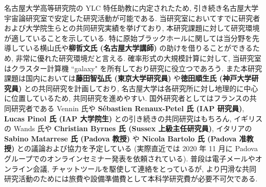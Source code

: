 \documentclass[11pt,a4paper,uplatex,dvipdfmx]{ujarticle} 		%
\newcommand{\研究課題名}{曲率ゆらぎの統計と原始ブラックホール量の精密対応}
\newcommand{\研究機関名}{名古屋大学}
\newcommand{\研究代表者氏名}{多田祐一郎}
\newcommand{\研究期間の最終元号年度}{4}  %
\renewcommand{\emph}[1]{{\sffamily\gtfamily\bfseries #1}}
\begin{document}
\noindent
名古屋大学高等研究院の YLC 特任助教に内定されたため, 引き続き名古屋大学宇宙論研究室で安定した研究活動が可能である.
当研究室においてすでに研究者および大学院生らとの共同研究実績を挙げており, 本研究課題に対して研究環境が適していることを示している.
特に原始ブラックホールに関しては当分野を先導している横山氏や\emph{柳哲文氏 (名古屋大学講師)} の助けを借りることができるため, 非常に優れた研究環境だと言える.
確率形式の大規模計算に対して, 当研究室はクラスター計算機 ``galaxy" を所有しており研究に役立つであろう.
また本研究課題は国内においては\emph{藤田智弘氏 (東京大学研究員)} や\emph{徳田順生氏 (神戸大学研究員)} との共同研究を計画しており,
名古屋大学は各研究所に対し地理的に中心に位置しているため, 共同研究を進めやすい.
国外研究者としてはフランスの共同研究者である Vennin 氏や \emph{S\'ebastien Renaux-Petel 氏 (IAP 研究員)}, \emph{Lucas Pinol 氏 (IAP 大学院生)} との引き続きの共同研究はもちろん,
イギリスの Wands 氏や \emph{Christian Byrnes 氏 (Sussex 上級主任研究員)}, イタリアの \emph{Sabino Matarrese 氏 (Padova 教授)} や \emph{Nicola Bartolo 氏 (Padova 准教授)}
との議論および協力を予定している (実際直近では 2020 年 11 月に Padova グループでのオンラインセミナー発表を依頼されている).
普段は電子メールやオンライン会議, チャットツールを駆使して連絡をとっているが, より円滑な共同研究活動のためには旅費や設備準備費として本科学研究費が必要不可欠である.



\bigskip
\end{document}
